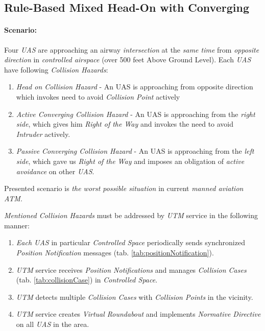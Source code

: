 \subsection{Rule-Based Mixed Head-On with Converging}\label{s:testRuleMixed}

\paragraph{Scenario:} Four \emph{UAS} are approaching an airway \emph{intersection} at the \emph{same time} from \emph{opposite direction} in \emph{controlled airspace} (over 500 feet Above Ground Level). Each \emph{UAS} have following \emph{Collision Hazards}:
\begin{enumerate}
	\item \emph{Head on Collision Hazard} - An UAS is approaching from opposite direction which invokes need to avoid \emph{Collision Point} actively

	\item \emph{Active Converging Collision Hazard} -  An UAS is approaching from the \emph{right side}, which gives him \emph{Right of the Way} and invokes the need to avoid \emph{Intruder} actively.

	\item \emph{Passive Converging Collision Hazard} - An UAS is approaching from the \emph{left side}, which gave us \emph{Right of the Way} and imposes an obligation of \emph{active avoidance} on other \emph{UAS}.
\end{enumerate}

\begin{note}
	Presented scenario is \emph{the worst possible situation} in current \emph{manned aviation ATM}. 
\end{note}

\noindent\emph{Mentioned Collision Hazards} must be addressed by \emph{UTM} service in the following manner:

\begin{enumerate}
	\item \emph{Each UAS} in particular \emph{Controlled Space} periodically sends synchronized \emph{Position Notification} messages (tab. \ref{tab:positionNotification}). 
	
	\item \emph{UTM} service receives \emph{Position Notifications} and manages \emph{Collision Cases} (tab. \ref{tab:collisionCase}) in \emph{Controlled Space}. 
	
	\item \emph{UTM} detects multiple \emph{Collision Cases} with \emph{Collision Points} in  the vicinity.
	
	\item \emph{UTM} service creates \emph{Virtual Roundabout} and implements \emph{Normative Directive} on all \emph{UAS} in the area.
\end{enumerate}

